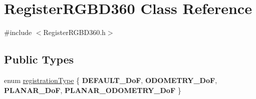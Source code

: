 \hypertarget{classRegisterRGBD360}{\section{Register\-R\-G\-B\-D360 Class Reference}
\label{classRegisterRGBD360}
}


{\ttfamily \#include $<$Register\-R\-G\-B\-D360.\-h$>$}

\subsection*{Public Types}
\begin{DoxyCompactItemize}
\item 
enum \hyperlink{classRegisterRGBD360_a919695c4544733673afeecdddd7f4937}{registration\-Type} \{ {\bfseries D\-E\-F\-A\-U\-L\-T\-\_\-Do\-F}, 
{\bfseries O\-D\-O\-M\-E\-T\-R\-Y\-\_\-Do\-F}, 
{\bfseries P\-L\-A\-N\-A\-R\-\_\-Do\-F}, 
{\bfseries P\-L\-A\-N\-A\-R\-\_\-\-O\-D\-O\-M\-E\-T\-R\-Y\-\_\-Do\-F}
 \}
\end{DoxyCompactItemize}

